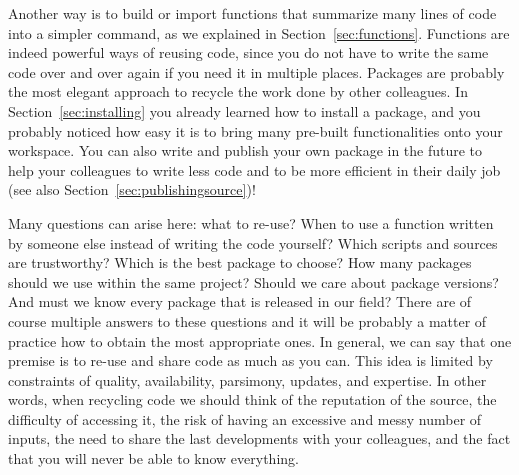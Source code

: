 Another way is to build or import functions that summarize many lines of code into a simpler command, as we explained in Section~\ref{sec:functions}. Functions are indeed powerful ways of reusing code, since you do not have to write the same code over and over again if you need it in multiple places. Packages are probably the most elegant approach to recycle the work done by other colleagues. In Section~\ref{sec:installing} you already learned how to install a package, and you probably noticed how easy it is to bring many pre-built functionalities onto your workspace. You can also write and publish your own package in the future to help your colleagues to write less code and to be more efficient in their daily job (see also Section~\ref{sec:publishingsource})!

Many questions can arise here: what to re-use? When to use a function written by someone else instead of writing the code yourself? Which scripts and sources are trustworthy? Which is the best package to choose? How many packages should we use within the same project? Should we care about package versions? And must we know every package that is released in our field? There are of course multiple answers to these questions and it will be probably a matter of practice how to obtain the most appropriate ones. In general, we can say that one premise is to re-use and share code as much as you can. This idea is limited by constraints of quality, availability, parsimony, updates, and expertise. In other words, when recycling code we should think of the reputation of the source, the difficulty of accessing it, the risk of having an excessive and messy number of inputs, the need to share the last developments with your colleagues, and the fact that you will never be able to know everything.

